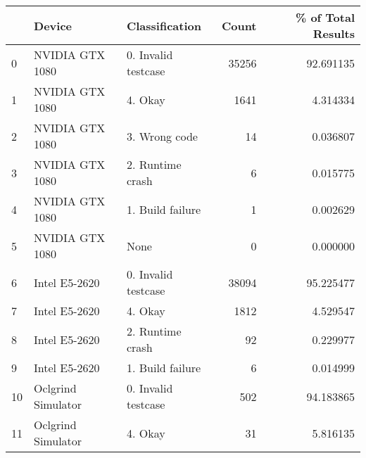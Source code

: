 \begin{tabular}{lllrr}
\toprule
{} &              Device &       Classification &  Count &  \% of Total Results \\
\midrule
0  &     NVIDIA GTX 1080 &  0. Invalid testcase &  35256 &           92.691135 \\
1  &     NVIDIA GTX 1080 &              4. Okay &   1641 &            4.314334 \\
2  &     NVIDIA GTX 1080 &        3. Wrong code &     14 &            0.036807 \\
3  &     NVIDIA GTX 1080 &     2. Runtime crash &      6 &            0.015775 \\
4  &     NVIDIA GTX 1080 &     1. Build failure &      1 &            0.002629 \\
5  &     NVIDIA GTX 1080 &                 None &      0 &            0.000000 \\
6  &       Intel E5-2620 &  0. Invalid testcase &  38094 &           95.225477 \\
7  &       Intel E5-2620 &              4. Okay &   1812 &            4.529547 \\
8  &       Intel E5-2620 &     2. Runtime crash &     92 &            0.229977 \\
9  &       Intel E5-2620 &     1. Build failure &      6 &            0.014999 \\
10 &  Oclgrind Simulator &  0. Invalid testcase &    502 &           94.183865 \\
11 &  Oclgrind Simulator &              4. Okay &     31 &            5.816135 \\
\bottomrule
\end{tabular}
